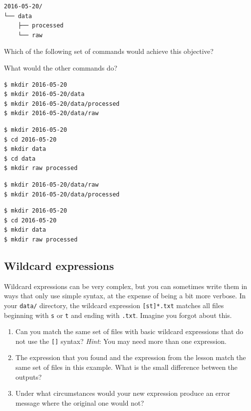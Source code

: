 \documentclass[
]{krantz}
\begin{document}
\begin{verbatim}
2016-05-20/
└── data
    ├── processed
    └── raw
\end{verbatim}

Which of the following set of commands would achieve this objective?

What would the other commands do?

\begin{verbatim}
$ mkdir 2016-05-20
$ mkdir 2016-05-20/data
$ mkdir 2016-05-20/data/processed
$ mkdir 2016-05-20/data/raw
\end{verbatim}

\begin{verbatim}
$ mkdir 2016-05-20
$ cd 2016-05-20
$ mkdir data
$ cd data
$ mkdir raw processed
\end{verbatim}

\begin{verbatim}
$ mkdir 2016-05-20/data/raw
$ mkdir 2016-05-20/data/processed
\end{verbatim}

\begin{verbatim}
$ mkdir 2016-05-20
$ cd 2016-05-20
$ mkdir data
$ mkdir raw processed
\end{verbatim}

\hypertarget{bash-basics-ex-wildcard-expressions}{%
\subsection{Wildcard expressions}\label{bash-basics-ex-wildcard-expressions}}

Wildcard expressions can be very complex, but you can sometimes write
them in ways that only use simple syntax, at the expense of being a bit
more verbose.
In your \texttt{data/} directory,
the wildcard expression \texttt{{[}st{]}*.txt}
matches all files beginning with \texttt{s} or \texttt{t} and ending with \texttt{.txt}.
Imagine you forgot about this.

\begin{enumerate}
\def\labelenumi{\arabic{enumi}.}
\item
  Can you match the same set of files with basic wildcard expressions
  that do not use the \texttt{{[}{]}} syntax? \emph{Hint}: You may need more than one
  expression.
\item
  The expression that you found and the expression from the lesson match the
  same set of files in this example. What is the small difference between the
  outputs?
\item
  Under what circumstances would your new expression produce an error message
  where the original one would not?
\end{enumerate}
\end{document}
